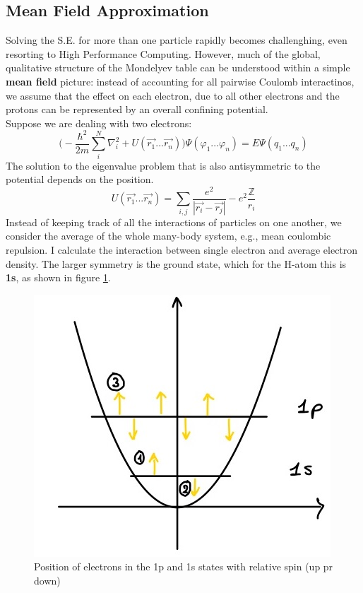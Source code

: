 \subsection{Mean Field Approximation}
Solving the S.E. for more than one particle rapidly becomes challenghing, even resorting to High Performance Computing. However, much of the global, qualitative structure of the Mondelyev table can be understood within a simple \textbf{mean field} picture: instead of accounting for all pairwise Coulomb interactinos, we assume that the effect on each electron, due to all other electrons and the protons can be represented by an overall confining potential.\\
Suppose we are dealing with two electrons: 
\[
\bigg(-\frac{\hbar^2}{2m}\sum_{i}^{N}\nabla^2_i+U(\vec{r_1}...\vec{r_n})\bigg)\Psi(\varphi_1 ... \varphi_n)=E\Psi(q_1 ... q_n)
\]
The solution to the eigenvalue problem that is also antisymmetric to the potential depends on the position.
\[
U(\vec{r_1}...\vec{r_n})=\sum_{i,j}\frac{e^2}{|\vec{r_i}-\vec{r_j}|}-e^2\frac{\mathbb{Z}}{r_i}
\]
Instead of keeping track of all the interactions of particles on one another, we consider the average of the whole many-body system, e.g., mean coulombic repulsion. I calculate the interaction between single electron and average electron density. The larger symmetry is the ground state, which for the H-atom this is \textbf{1s}, as shown in figure \ref{fig:spin1}.\\
\begin{figure}[htbp!]
	\centering
	\includegraphics[scale=0.20]{img_6}
	\caption{Position of electrons in the 1p and 1s states with relative spin (up pr down)}
	\label{fig:spin1}
\end{figure}
